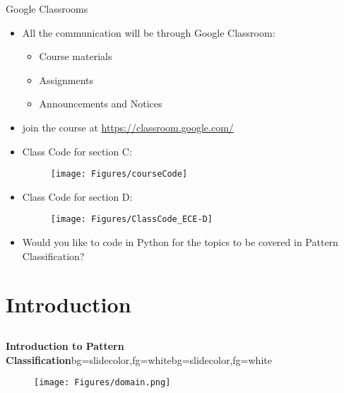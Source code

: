 \begin{frame}{Google Classrooms}
\begin{normalsize}
\begin{itemize}
\item All the communication will be through {\color{mycolor2}Google Classroom}:
\begin{itemize}
\item Course materials
\item Assignments
\item Announcements and Notices
\end{itemize}
\item join the course at {\color{blue}\url{https://classroom.google.com/}}
\item  {\color{mycolor2}Class Code} for section C: 
\begin{figure}
\centering
\texttt{[image: Figures/courseCode]}
\end{figure}
\item  {\color{mycolor2}Class Code} for section D: 
\begin{figure}
\centering
\texttt{[image: Figures/ClassCode\_ECE-D]}
\end{figure}
\item Would you like to {\color{mycolor1}code in Python} for the topics to be covered in Pattern Classification?
\end{itemize}
\end{normalsize}
\end{frame}


\section{Introduction}
\subsection{}
\begin{frame}{}
\begin{variableblock}{\centering \Large \textbf{\vspace{4pt}\newline Introduction to Pattern Classification\vspace{4pt}}}{bg=slidecolor,fg=white}{bg=slidecolor,fg=white}
\end{variableblock}
\begin{figure}
\centering
\texttt{[image: Figures/domain.png]}
\end{figure}
\end{frame}

